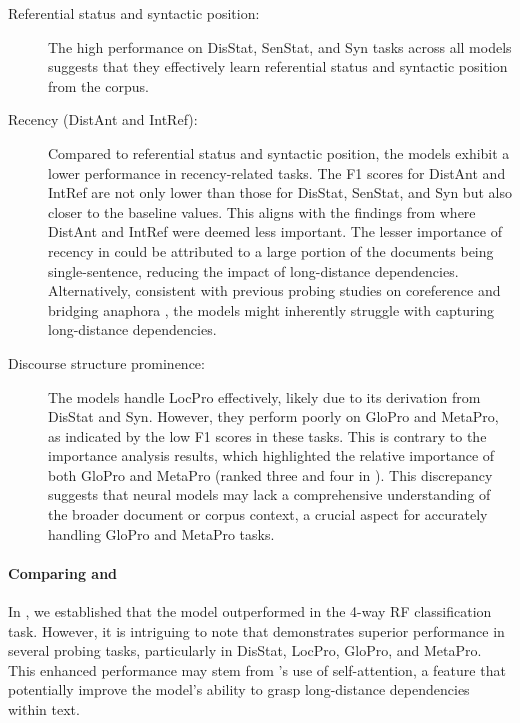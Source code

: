 \begin{description}
	\item[Referential status and syntactic position:] The high performance on DisStat, SenStat, and Syn tasks across all models suggests that they effectively learn referential status and syntactic position from the \webnlg corpus.
	
	\item[Recency (DistAnt and IntRef):] Compared to referential status and syntactic position, the models exhibit a lower performance in recency-related tasks. The F1 scores for DistAnt and IntRef are not only lower than those for DisStat, SenStat, and Syn but also closer to the baseline values. This aligns with the findings from  where DistAnt and IntRef were deemed less important. The lesser importance of recency in \webnlg could be attributed to a large portion of the documents being single-sentence, reducing the impact of long-distance dependencies. Alternatively, consistent with previous probing studies on coreference and bridging anaphora \citep{sorodoc-etal-2020-probing, pandit-hou-2021-probing}, the models might inherently struggle with capturing long-distance dependencies.
	
	\item[Discourse structure prominence:] The models handle LocPro effectively, likely due to its derivation from DisStat and Syn. However, they perform poorly on GloPro and MetaPro, as indicated by the low F1 scores in these tasks. This is contrary to the importance analysis results, which highlighted the relative importance of both GloPro and MetaPro (ranked three and four in ). This discrepancy suggests that neural models may lack a comprehensive understanding of the broader document or corpus context, a crucial aspect for accurately handling GloPro and MetaPro tasks.
	
\end{description}







\paragraph*{Comparing  and }

In , we established that the  model outperformed  in the 4-way RF classification task. However, it is intriguing to note that  demonstrates superior performance in several probing tasks, particularly in DisStat, LocPro, GloPro, and MetaPro. This enhanced performance may stem from 's use of self-attention, a feature that potentially improve the model's ability to grasp long-distance dependencies within text.

